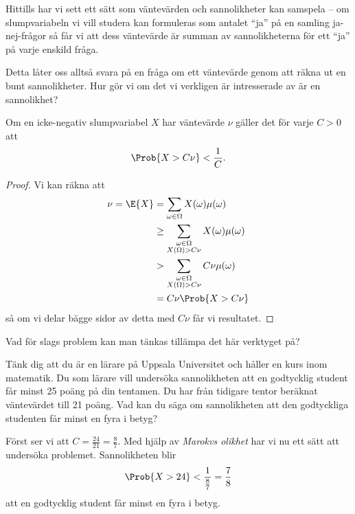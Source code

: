 \documentclass[nobib]{tufte-handout}
\begin{document}
Hittills har vi sett ett sätt som väntevärden och sannolikheter kan samspela -- om slumpvariabeln vi vill studera kan formuleras som antalet ``ja'' på en samling ja-nej-frågor så får vi att dess väntevärde är summan av sannolikheterna för ett ``ja'' på varje enskild fråga.

Detta låter oss alltså svara på en fråga om ett väntevärde genom att räkna ut en bunt sannolikheter. Hur gör vi om det vi verkligen är intresserade av är en sannolikhet?

\begin{lemma}
    Om en icke-negativ slumpvariabel $X$ har väntevärde $\nu$ gäller det för varje $C > 0$ att
    $$\Prob{X > C\nu} < \frac{1}{C}.$$

    \begin{proof}
        Vi kan räkna att
        \begin{align*}
            \nu = \E{X} &= \sum_{\omega \in \Omega} X(\omega)\mu(\omega)\\
            &\geq \sum_{\substack{\omega \in \Omega\\X(\Omega) > C\nu}} X(\omega)\mu(\omega)\\
            &> \sum_{\substack{\omega \in \Omega\\X(\Omega) > C\nu}} C\nu\mu(\omega)\\
            &= C\nu \Prob{X > C\nu}
        \end{align*}
        så om vi delar bägge sidor av detta med $C\nu$ får vi resultatet.
    \end{proof}
\end{lemma}

Vad för slags problem kan man tänkas tillämpa det här verktyget på?
\begin{example}
    Tänk dig att du är en lärare på Uppsala Universitet och håller en kurs inom matematik. Du som lärare vill undersöka sannolikheten att en godtycklig student får minst 25 poäng på din tentamen. Du har från tidigare tentor beräknat väntevärdet till 21 poäng. Vad kan du säga om sannolikheten att den godtyckliga studenten får minst en fyra i betyg?
    
    Först ser vi att $C=\frac{24}{21}=\frac{8}{7}$. Med hjälp av \textit{Marokvs olikhet} har vi nu ett sätt att undersöka problemet. Sannolikheten blir
    $$\Prob{X > 24} < \frac{1}{\frac{8}{7}} = \frac{7}{8}$$
    att en godtycklig student får minst en fyra i betyg. 
\end{example}
\end{document}
